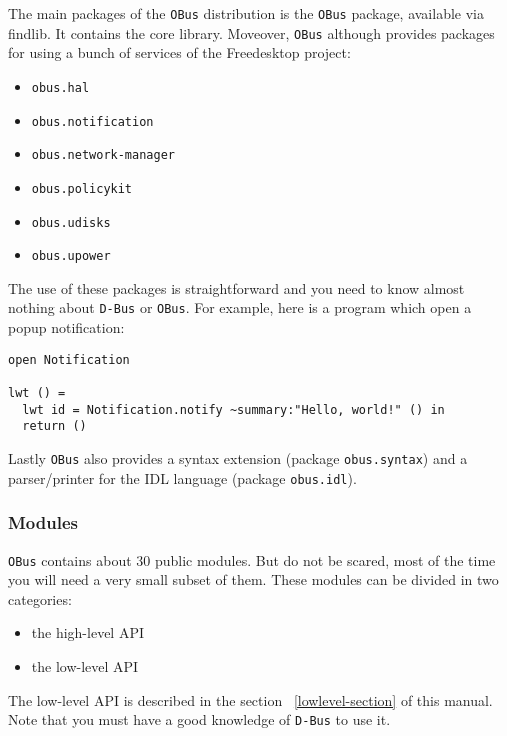 \documentclass{article}
\newcommand{\obus}{\texttt{OBus}\xspace}
\newcommand{\dbus}{\texttt{D-Bus}\xspace}
\begin{document}
The main packages of the \obus distribution is the \obus package,
available via findlib. It contains the core library. Moveover, \obus
although provides packages for using a bunch of services of the
Freedesktop project:

\begin{itemize}
\item \texttt{obus.hal}
\item \texttt{obus.notification}
\item \texttt{obus.network-manager}
\item \texttt{obus.policykit}
\item \texttt{obus.udisks}
\item \texttt{obus.upower}
\end{itemize}

The use of these packages is straightforward and you need to know
almost nothing about \dbus or \obus. For example, here is a program
which open a popup notification:

\begin{lstlisting}
open Notification

lwt () =
  lwt id = Notification.notify ~summary:"Hello, world!" () in
  return ()
\end{lstlisting}

Lastly \obus also provides a syntax extension (package
\texttt{obus.syntax}) and a parser/printer for the IDL language
(package \texttt{obus.idl}).

\subsubsection{Modules}

\obus contains about 30 public modules. But do not be scared, most of
the time you will need a very small subset of them. These modules can
be divided in two categories:

\begin{itemize}
\item{the high-level API}
\item{the low-level API}
\end{itemize}

The low-level API is described in the section ~\ref{lowlevel-section}
of this manual. Note that you must have a good knowledge of \dbus to
use it.

\end{document}
